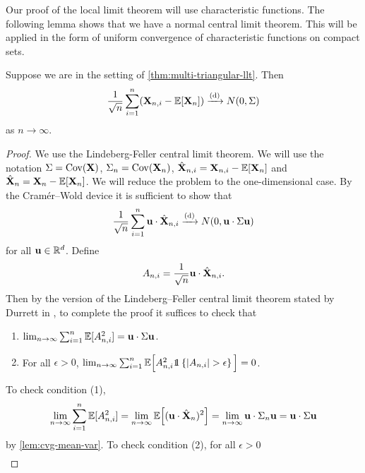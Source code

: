 Our proof of the local limit theorem will use characteristic functions. The following lemma shows that we have a normal central limit theorem. This will be applied in the form of uniform convergence of characteristic functions on compact sets.
\begin{lemma}
    \label{lem:clt}
    Suppose we are in the setting of \cref{thm:multi-triangular-llt}. Then
    \begin{equation*}
        \frac{1}{\sqrt{n}} \sum_{i=1}^n ({\mathbf X}_{n, i} - {\mathbb E}[{\mathbf X}_n]) \xrightarrow[]{\text{(d)}} N(0, \Sigma)
    \end{equation*}
    as $n \to \infty$.
\end{lemma}
\begin{proof}
    We use the Lindeberg-Feller central limit theorem. We will use the notation $\Sigma = \operatorname{Cov}({\mathbf X})$, $\Sigma_n = \operatorname{Cov}({\mathbf X}_n)$, $\hat{{\mathbf X}}_{n, i} = {\mathbf X}_{n, i} - {\mathbb E}[{\mathbf X}_n]$ and $\hat{{\mathbf X}}_n = {\mathbf X}_n - {\mathbb E}[{\mathbf X}_n]$. We will reduce the problem to the one-dimensional case. By the Cramér--Wold device it is sufficient to show that 
    \begin{equation*}
        \frac{1}{\sqrt{n}} \sum_{i=1}^n {\mathbf u} \cdot \hat{{\mathbf X}}_{n, i} \xrightarrow[]{\text{(d)}}
        N(0, {\mathbf u} \cdot \Sigma {\mathbf u})
    \end{equation*}
    for all ${\mathbf u} \in {\mathbb R}^d$. Define
    \begin{equation*}
        A_{n, i} = \frac{1}{\sqrt{n}} {\mathbf u} \cdot \hat{{\mathbf X}}_{n, i}.
    \end{equation*}
    Then by the version of the Lindeberg--Feller central limit theorem stated by Durrett in \cite[P.128-129, Theorem 3.4.10]{durrettProbabilityTheoryExamples2019}, to complete the proof it suffices to check that
    \begin{enumerate}
        \item $\lim_{n \to \infty} \sum_{i=1}^n {\mathbb E}[A_{n, i}^2] = {\mathbf u} \cdot \Sigma {\mathbf u}$.
        \item For all $\epsilon > 0$, $\lim_{n \to \infty} \sum_{i=1}^n \E\Big[A_{n, i}^2 \one\left\{ \abs{A_{n, i}} > \epsilon \right\}\Big] = 0$.
    \end{enumerate}
    To check condition (1),
    \begin{align*}
        \lim_{n \to \infty} \sum_{i=1}^n {\mathbb E}[A_{n, i}^2]
        = \lim_{n \to \infty} {\mathbb E}\Big[ ({\mathbf u} \cdot \hat{{\mathbf X}}_n)^2 \Big]
        = \lim_{n \to \infty} {\mathbf u} \cdot \Sigma_n {\mathbf u}
        = {\mathbf u} \cdot \Sigma {\mathbf u}
    \end{align*}
    by \cref{lem:cvg-mean-var}. To check condition (2), for all $\epsilon > 0$
    \begin{align*}

\end{align*}
\end{proof}
